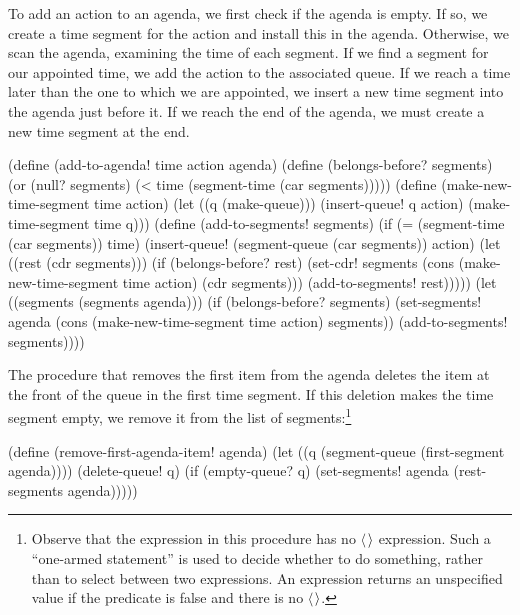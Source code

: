 \noindent
To add an action to an agenda, we first check if the agenda is empty.  If so,
we create a time segment for the action and install this in the agenda.
Otherwise, we scan the agenda, examining the time of each segment.  If we find
a segment for our appointed time, we add the action to the associated queue.
If we reach a time later than the one to which we are appointed, we insert a
new time segment into the agenda just before it.  If we reach the end of the
agenda, we must create a new time segment at the end.

\begin{codeBlock}
(define (add-to-agenda! time action agenda)
  (define (belongs-before? segments)
    (or (null? segments)
        (< time (segment-time (car segments)))))
  (define (make-new-time-segment time action)
    (let ((q (make-queue)))
      (insert-queue! q action)
      (make-time-segment time q)))
  (define (add-to-segments! segments)
    (if (= (segment-time (car segments)) time)
        (insert-queue! (segment-queue (car segments))
                       action)
        (let ((rest (cdr segments)))
          (if (belongs-before? rest)
              (set-cdr!
                segments
                (cons (make-new-time-segment time
                                             action)
                      (cdr segments)))
              (add-to-segments! rest)))))
  (let ((segments (segments agenda)))
    (if (belongs-before? segments)
        (set-segments!
          agenda
          (cons (make-new-time-segment time action)
                segments))
        (add-to-segments! segments))))
\end{codeBlock}

\noindent
The procedure that removes the first item from the agenda deletes the item at
the front of the queue in the first time segment.  If this deletion makes the
time segment empty, we remove it from the list of segments:\footnote{Observe
that the  expression in this procedure has no \( \langle \)\( \kern0.08em\rangle \)
expression.  Such a ``one-armed  statement'' is used to decide whether
to do something, rather than to select between two expressions.  An 
expression returns an unspecified value if the predicate is false and there is
no \( \langle \)\( \kern0.08em\rangle \).}

\begin{codeBlock}
(define (remove-first-agenda-item! agenda)
  (let ((q (segment-queue (first-segment agenda))))
    (delete-queue! q)
    (if (empty-queue? q)
        (set-segments! agenda (rest-segments agenda)))))
\end{codeBlock}


